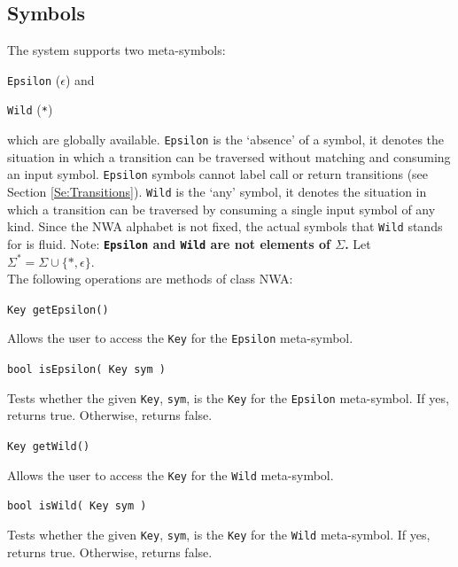 \documentclass{llncs}
\begin{document}
\subsection{Symbols}
\label{Se:Symbols}

The system supports two meta-symbols: \begin{inparaenum} \item \texttt{Epsilon} (\texttt{$\epsilon$}) and \item \texttt{Wild} (\texttt{*}) \end{inparaenum} which are globally available.  \texttt{Epsilon} is the `absence' of a symbol, it denotes the situation in which a transition can be traversed without matching and consuming an input symbol.  \texttt{Epsilon} symbols cannot label call or return transitions (see Section \ref{Se:Transitions}).  \texttt{Wild} is the `any' symbol, it denotes the situation in which a transition can be traversed by consuming a single input symbol of any kind.  Since the NWA alphabet is not fixed, the actual symbols that \texttt{Wild} stands for is fluid.  Note: \textbf{\texttt{Epsilon} and \texttt{Wild} are not elements of $\Sigma$.} Let $\Sigma^* = \Sigma \cup \{*, \epsilon\}$.\\  

\noindent The following operations are methods of class NWA:

\begin{description}

  \item\texttt{Key getEpsilon()} \nopagebreak

    Allows the user to access the \texttt{Key} for the \texttt{Epsilon} meta-symbol.

  \item\texttt{bool isEpsilon( Key sym )} \nopagebreak

    Tests whether the given \texttt{Key}, \texttt{sym}, is the \texttt{Key} for the \texttt{Epsilon} meta-symbol.  If yes, returns true.  Otherwise, returns false.

  \item\texttt{Key getWild()} \nopagebreak

    Allows the user to access the \texttt{Key} for the \texttt{Wild} meta-symbol.

  \item\texttt{bool isWild( Key sym )} \nopagebreak
 
    Tests whether the given \texttt{Key}, \texttt{sym}, is the \texttt{Key} for the \texttt{Wild} meta-symbol. If yes, returns true.  Otherwise, returns false. \\

\end{description}
\end{document}
